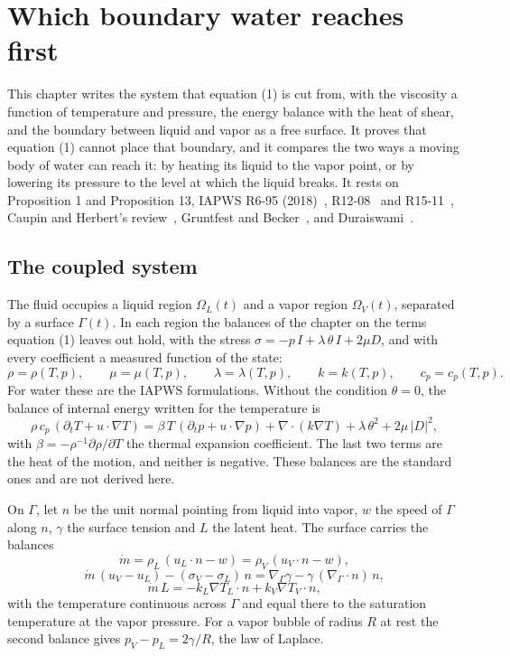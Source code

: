 \chapter{Which boundary water reaches first}

This chapter writes the system that equation (1) is cut from, with the viscosity a function of
temperature and pressure, the energy balance with the heat of shear, and the boundary between
liquid and vapor as a free surface. It proves that equation (1) cannot place that boundary, and it
compares the two ways a moving body of water can reach it: by heating its liquid to the vapor
point, or by lowering its pressure to the level at which the liquid breaks. It rests on
Proposition 1 and Proposition 13, IAPWS R6-95 (2018)~\cite{src:IAPWS-R6-95-2018},
R12-08~\cite{src:IAPWS-R12-08} and R15-11~\cite{src:IAPWS-R15-11}, Caupin and Herbert's
review~\cite{src:Caupin-and-Herbert-2006}, Gruntfest and
Becker~\cite{src:Gruntfest-and-Becker-1964}, and Duraiswami~\cite{src:Duraiswami-2026}.

\section{The coupled system}

The fluid occupies a liquid region $\Omega_L(t)$ and a vapor region $\Omega_V(t)$, separated by a
surface $\Gamma(t)$. In each region the balances of the chapter on the terms equation (1) leaves out hold, with the
stress $\sigma = -p\,I + \lambda\,\theta\,I + 2\mu D$, and with every coefficient a measured
function of the state:
\[
\rho = \rho(T,p), \qquad \mu = \mu(T,p), \qquad \lambda = \lambda(T,p), \qquad k = k(T,p), \qquad
c_p = c_p(T,p).
\]
For water these are the IAPWS formulations. Without the condition $\theta = 0$, the balance of
internal energy written for the temperature is
\[
\rho\,c_p\,(\partial_t T + u\cdot\nabla T) = \beta\,T\,(\partial_t p + u\cdot\nabla p)
+ \nabla\cdot(k\nabla T) + \lambda\,\theta^2 + 2\mu\,|D|^2 ,
\]
with $\beta = -\rho^{-1}\partial\rho/\partial T$ the thermal expansion coefficient. The last two
terms are the heat of the motion, and neither is negative. These balances are the standard ones
and are not derived here.

On $\Gamma$, let $n$ be the unit normal pointing from liquid into vapor, $w$ the speed of $\Gamma$
along $n$, $\gamma$ the surface tension and $L$ the latent heat. The surface carries the balances
\[
\dot m = \rho_L\,(u_L\cdot n - w) = \rho_V\,(u_V\cdot n - w),
\]
\[
\dot m\,(u_V - u_L) - (\sigma_V - \sigma_L)\,n = \nabla_\Gamma\gamma - \gamma\,(\nabla_\Gamma\cdot n)\,n,
\]
\[
\dot m\,L = -k_L\nabla T_L\cdot n + k_V\nabla T_V\cdot n,
\]
with the temperature continuous across $\Gamma$ and equal there to the saturation temperature at
the vapor pressure. For a vapor bubble of radius $R$ at rest the second balance gives
$p_V - p_L = 2\gamma/R$, the law of Laplace.


